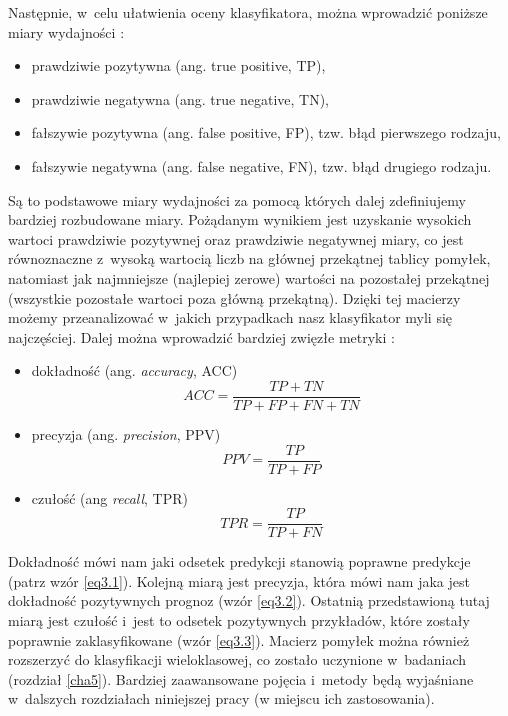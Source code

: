 \noindent Następnie, w~celu ułatwienia oceny klasyfikatora, można wprowadzić poniższe miary wydajności \cite{Sawka18, wiki:latex}:
\begin{itemize}
\item
prawdziwie pozytywna (ang. true positive, TP),

\item
prawdziwie negatywna (ang. true negative, TN),

\item
fałszywie pozytywna (ang. false positive, FP), tzw. błąd pierwszego rodzaju,

\item
fałszywie negatywna (ang. false negative, FN), tzw. błąd drugiego rodzaju.
\end{itemize}
\noindent Są to podstawowe miary wydajności za pomocą których dalej zdefiniujemy bardziej rozbudowane miary. Pożądanym wynikiem jest uzyskanie wysokich wartoci prawdziwie pozytywnej oraz prawdziwie negatywnej miary, co jest równoznaczne z~wysoką wartocią liczb na głównej przekątnej tablicy pomyłek, natomiast jak najmniejsze (najlepiej zerowe) wartości na pozostałej przekątnej (wszystkie pozostałe wartoci poza główną przekątną). Dzięki tej macierzy możemy przeanalizować w~jakich przypadkach nasz klasyfikator myli się najczęściej. Dalej można wprowadzić bardziej zwięzłe metryki \cite{Sawka18}:
\begin{itemize}

\item
dokładność (ang. \textit{accuracy}, ACC)
\begin{equation}
\label{eq3.1}
ACC=\frac {TP+TN} {TP+FP+FN+TN}
\end{equation}

\item
precyzja (ang. \textit{precision}, PPV)
\begin{equation}
\label{eq3.2}
PPV=\frac {TP} {TP+FP}
\end{equation}

\item
czułość (ang \textit{recall}, TPR)
\begin{equation}
\label{eq3.3}
TPR=\frac {TP} {TP+FN}
\end{equation}
\end{itemize}

\noindent Dokładność mówi nam jaki odsetek predykcji stanowią poprawne predykcje (patrz wzór \ref{eq3.1}). Kolejną miarą jest precyzja, która mówi nam jaka jest dokładność pozytywnych prognoz (wzór \ref{eq3.2}). Ostatnią przedstawioną tutaj miarą jest czułość i~jest to odsetek pozytywnych przykładów, które zostały poprawnie zaklasyfikowane (wzór \ref{eq3.3}). Macierz pomyłek można również rozszerzyć do klasyfikacji wieloklasowej, co zostało uczynione w~badaniach (rozdział \ref{cha5}). Bardziej zaawansowane pojęcia i~metody będą wyjaśniane w~dalszych rozdziałach niniejszej pracy (w miejscu ich zastosowania).


